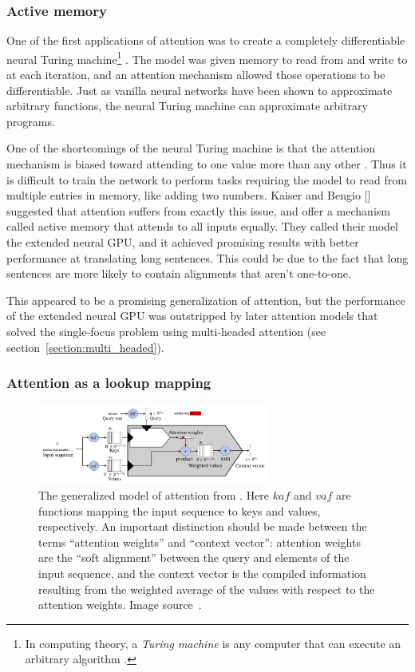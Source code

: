 \documentclass{article}
\begin{document}
\subsubsection{Active memory}

One of the first applications of attention was to create a completely differentiable neural Turing machine\footnote{In computing theory, a \textit{Turing machine} is any computer that can execute an arbitrary algorithm \cite{wiki:turing}.} \cite{neural_turing}. The model was given memory to read from and write to at each iteration, and an attention mechanism allowed those operations to be differentiable. Just as vanilla neural networks have been shown to approximate arbitrary functions, the neural Turing machine can approximate arbitrary programs.

One of the shortcomings of the neural Turing machine is that the attention mechanism is biased toward attending to one value more than any other \cite{active_memory}. Thus it is difficult to train the network to perform tasks requiring the model to read from multiple entries in memory, like adding two numbers. Kaiser and Bengio [\citeyear{active_memory}] suggested that attention suffers from exactly this issue, and offer a mechanism called active memory that attends to all inputs equally. They called their model the extended neural GPU, and it achieved promising results with better performance at translating long sentences. This could be due to the fact that long sentences are more likely to contain alignments that aren't one-to-one.

This appeared to be a promising generalization of attention, but the performance of the extended neural GPU was outstripped by later attention models that solved the single-focus problem using multi-headed attention \cite{attn_all_you_need} (see section~\ref{section:multi_headed}).

\subsubsection{Attention as a lookup mapping}

\begin{figure}
    \centering
    \includegraphics[width=3in]{figures/queries_keys_values.png}
\caption{The generalized model of attention from \protect\cite{attention_please}. Here $kaf$ and $vaf$ are functions mapping the input sequence to keys and values, respectively. An important distinction should be made between the terms ``attention weights'' and ``context vector'': attention weights are the ``soft alignment'' between the query and elements of the input sequence, and the context vector is the compiled information resulting from the weighted average of the values with respect to the attention weights. Image source~\protect\cite{attention_please}.}\label{figure:queries_keys_values}
\end{figure}
\end{document}
